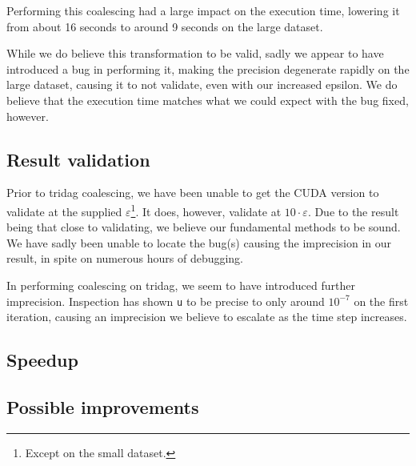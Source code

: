 \documentclass[a4paper]{article}
\def\epsilon\varepsilon
\begin{document}
Performing this coalescing had a large impact on the execution time, lowering
it from about 16 seconds to around 9 seconds on the large dataset.

While we do believe this transformation to be valid, sadly we appear to have
introduced a bug in performing it, making the precision degenerate rapidly
on the large dataset, causing it to not validate, even with our increased
epsilon. We do believe that the execution time matches what we could expect
with the bug fixed, however.

\subsection{Result validation}

Prior to tridag coalescing, we have been unable to get the CUDA version to
validate at the supplied $\epsilon$\footnote{Except on the small dataset.}. It
does, however, validate at $10 \cdot \epsilon$. Due to the result being that
close to validating, we believe our fundamental methods to be sound. We have
sadly been unable to locate the bug(s) causing the imprecision in our result,
in spite on numerous hours of debugging.

In performing coalescing on tridag, we seem to have introduced further
imprecision. Inspection has shown \texttt{u} to be precise to only around
$10^{-7}$ on the first iteration, causing an imprecision we believe to
escalate as the time step increases.

\subsection{Speedup}


\subsection{Possible improvements}

\end{document}
